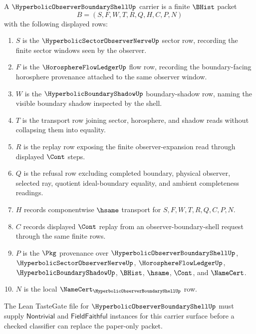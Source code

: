 \begin{definition}
\label{def:hyperbolic-observer-boundary-shell-carrier}
A $\HyperbolicObserverBoundaryShellUp$ carrier is a finite $\BHist$ packet
$$
B=(S,F,W,T,R,Q,H,C,P,N)
$$
with the following displayed rows:
\begin{enumerate}
\item $S$ is the $\HyperbolicSectorObserverNerveUp$ sector row, recording the finite sector windows seen by the observer.
\item $F$ is the $\HorosphereFlowLedgerUp$ flow row, recording the boundary-facing horosphere provenance attached to the same observer window.
\item $W$ is the $\HyperbolicBoundaryShadowUp$ boundary-shadow row, naming the visible boundary shadow inspected by the shell.
\item $T$ is the transport row joining sector, horosphere, and shadow reads without collapsing them into equality.
\item $R$ is the replay row exposing the finite observer-expansion read through displayed $\Cont$ steps.
\item $Q$ is the refusal row excluding completed boundary, physical observer, selected ray, quotient ideal-boundary equality, and ambient completeness readings.
\item $H$ records componentwise $\hsame$ transport for $S,F,W,T,R,Q,C,P,N$.
\item $C$ records displayed $\Cont$ replay from an observer-boundary-shell request through the same finite rows.
\item $P$ is the $\Pkg$ provenance over $\HyperbolicObserverBoundaryShellUp$, $\HyperbolicSectorObserverNerveUp$, $\HorosphereFlowLedgerUp$, $\HyperbolicBoundaryShadowUp$, $\BHist$, $\hsame$, $\Cont$, and $\NameCert$.
\item $N$ is the local $\NameCert_{\HyperbolicObserverBoundaryShellUp}$ row.
\end{enumerate}
The Lean TasteGate file for $\HyperbolicObserverBoundaryShellUp$ must supply $\mathsf{Nontrivial}$ and $\mathsf{FieldFaithful}$ instances for this carrier surface before a checked classifier can replace the paper-only packet.
\end{definition}

